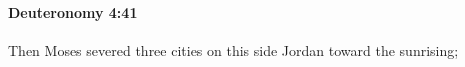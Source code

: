 
		\paragraph{Deuteronomy 4:41} %
			\label{DEUTERONOMY-4-41}

			Then Moses severed three cities on this side Jordan toward the sunrising;



